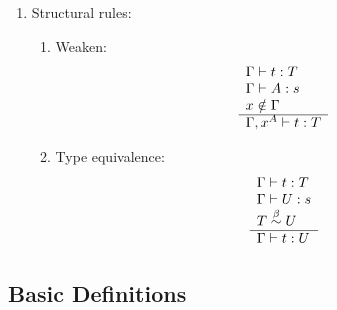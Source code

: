 \begin{definition}
\begin{enumerate}
    \item Structural rules:
        \begin{enumerate}
            \item Weaken:
                $$
                \begin{array}{l} 
                    \Gamma \vdash t: T
                    \\
                    \Gamma \vdash A: s
                    \\
                    x \notin \Gamma
                 \\ \hline 
                    \Gamma, x^A \vdash t: T
                \end{array}
                $$

            \item Type equivalence:
                $$
                \begin{array}{l} 
                    \Gamma \vdash t: T
                    \\
                    \Gamma \vdash U: s
                    \\
                    T \stackrel{\beta}{\sim} U
                 \\ \hline 
                    \Gamma \vdash t: U
                \end{array}
                $$

        \end{enumerate}
    \end{enumerate}
\end{definition}



\subsection{Basic Definitions}

